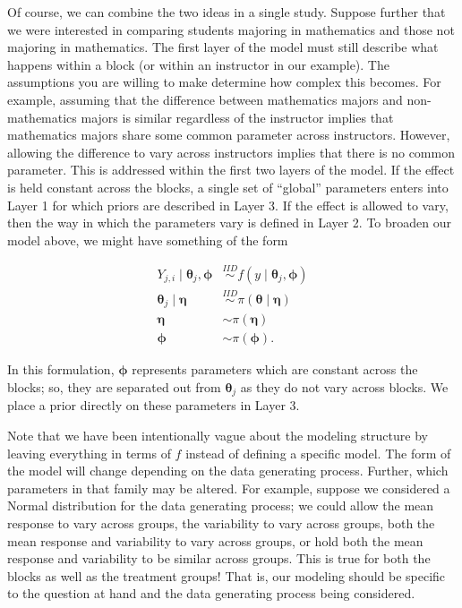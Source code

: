 \documentclass[
  letterpaper,
  DIV=11,
  numbers=noendperiod]{scrreprt}
\theoremstyle{definition}
\theoremstyle{definition}
\theoremstyle{plain}
\theoremstyle{remark}
\begin{document}
Of course, we can combine the two ideas in a single study. Suppose
further that we were interested in comparing students majoring in
mathematics and those not majoring in mathematics. The first layer of
the model must still describe what happens within a block (or within an
instructor in our example). The assumptions you are willing to make
determine how complex this becomes. For example, assuming that the
difference between mathematics majors and non-mathematics majors is
similar regardless of the instructor implies that mathematics majors
share some common parameter across instructors. However, allowing the
difference to vary across instructors implies that there is no common
parameter. This is addressed within the first two layers of the model.
If the effect is held constant across the blocks, a single set of
``global'' parameters enters into Layer 1 for which priors are described
in Layer 3. If the effect is allowed to vary, then the way in which the
parameters vary is defined in Layer 2. To broaden our model above, we
might have something of the form

\[
\begin{aligned}
  Y_{j, i} \mid \boldsymbol{\theta}_j, \boldsymbol{\phi} &\stackrel{IID}{\sim} f(y \mid \boldsymbol{\theta}_j, \boldsymbol{\phi}) \\
  \boldsymbol{\theta}_j \mid \boldsymbol{\eta} &\stackrel{IID}{\sim} \pi(\boldsymbol{\theta} \mid \boldsymbol{\eta}) \\
  \boldsymbol{\eta} &\sim \pi(\boldsymbol{\eta}) \\
  \boldsymbol{\phi} &\sim \pi(\boldsymbol{\phi}).
\end{aligned}
\]

In this formulation, \(\boldsymbol{\phi}\) represents parameters which
are constant across the blocks; so, they are separated out from
\(\boldsymbol{\theta}_j\) as they do not vary across blocks. We place a
prior directly on these parameters in Layer 3.

Note that we have been intentionally vague about the modeling structure
by leaving everything in terms of \(f\) instead of defining a specific
model. The form of the model will change depending on the data
generating process. Further, which parameters in that family may be
altered. For example, suppose we considered a Normal distribution for
the data generating process; we could allow the mean response to vary
across groups, the variability to vary across groups, both the mean
response and variability to vary across groups, or hold both the mean
response and variability to be similar across groups. This is true for
both the blocks as well as the treatment groups! That is, our modeling
should be specific to the question at hand and the data generating
process being considered.
\end{document}
